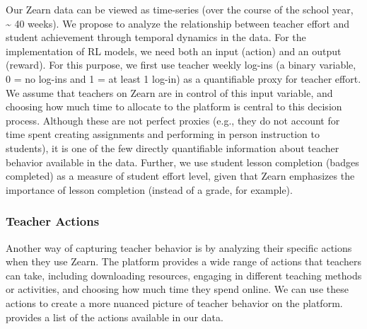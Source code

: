 \documentclass[
  number,
  preprint,
  3p,
  onecolumn]{elsarticle}
\begin{document}
Our Zearn data can be viewed as time-series (over the course of the
school year, \textasciitilde{} 40 weeks). We propose to analyze the
relationship between teacher effort and student achievement through
temporal dynamics in the data. For the implementation of RL models, we
need both an input (action) and an output (reward). For this purpose, we
first use teacher weekly log-ins (a binary variable, 0 = no log-ins and
1 = at least 1 log-in) as a quantifiable proxy for teacher effort. We
assume that teachers on Zearn are in control of this input variable, and
choosing how much time to allocate to the platform is central to this
decision process. Although these are not perfect proxies (e.g., they do
not account for time spent creating assignments and performing in person
instruction to students), it is one of the few directly quantifiable
information about teacher behavior available in the data. Further, we
use student lesson completion (badges completed) as a measure of student
effort level, given that Zearn emphasizes the importance of lesson
completion (instead of a grade, for example).

\hypertarget{teacher-actions}{%
\subsubsection{Teacher Actions}\label{teacher-actions}}

Another way of capturing teacher behavior is by analyzing their specific
actions when they use Zearn. The platform provides a wide range of
actions that teachers can take, including downloading resources,
engaging in different teaching methods or activities, and choosing how
much time they spend online. We can use these actions to create a more
nuanced picture of teacher behavior on the platform. provides a list of
the actions available in our data.
\end{document}
